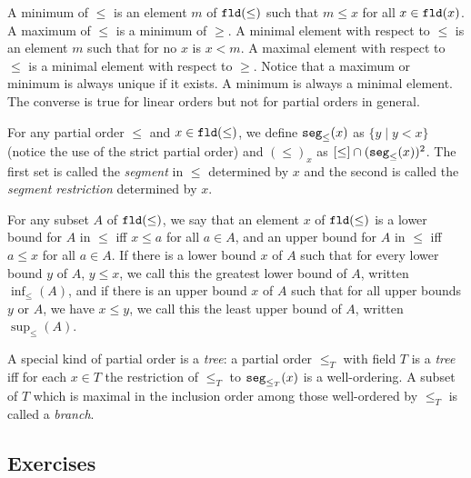\documentclass[12pt]{book}
\begin{document}
\begin{description}
A minimum of $\leq$ is an element $m$ of ${\tt fld}(\leq)$ such that
$m \leq x$ for all $x \in {\tt fld}(x)$.  A maximum of $\leq$ is a
minimum of $\geq$.  A minimal element with respect to $\leq$ is an
element $m$ such that for no $x$ is $x < m$.  A maximal element with
respect to $\leq$ is a minimal element with respect to $\geq$.  Notice
that a maximum or minimum is always unique if it exists.  A minimum is
always a minimal element.  The converse is true for linear orders but
not for partial orders in general.

For any partial order $\leq$ and $x \in {\tt fld}(\leq)$, we define
${\tt seg}_{\leq}(x)$ as $\{y \mid y < x\}$ (notice the use of the
strict partial order) and $(\leq)_x$ as $[\leq] \cap ({\tt
seg}_{\leq}(x))^2$.  The first set is called the {\em segment\/} in $\leq$
determined by $x$ and the second is called the {\em segment restriction\/}
determined by $x$.

For any subset $A$ of ${\tt fld}(\leq)$, we say that an element $x$ of
${\tt fld}(\leq)$ is a lower bound for $A$ in $\leq$ iff $x \leq a$
for all $a \in A$, and an upper bound for $A$ in $\leq$ iff $a \leq x$
for all $a \in A$.  If there is a lower bound $x$ of $A$ such that for
every lower bound $y$ of $A$, $y \leq x$, we call this the greatest
lower bound of $A$, written $\inf_{\leq}(A)$, and if there is an upper
bound $x$ of $A$ such that for all upper bounds $y$ or $A$, we have $x
\leq y$, we call this the least upper bound of $A$, written
$\sup_{\leq}(A)$.

A special kind of partial order is a {\em tree}: a partial order
$\leq_T$ with field $T$ is a {\em tree\/} iff for each $x \in T$ the
restriction of $\leq_T$ to ${\tt seg}_{\leq_T}(x)$ is a well-ordering.
A subset of $T$ which is maximal in the inclusion order among those
well-ordered by $\leq_T$ is called a {\em branch\/}.

\end{description}

\newpage

\subsection{Exercises}
\end{document}
